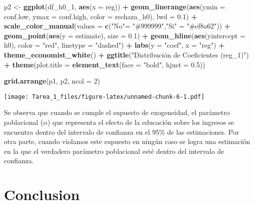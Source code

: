\documentclass[
]{article}
\newenvironment{Shaded}{\begin{snugshade}}{\end{snugshade}}
\newcommand{\AttributeTok}[1]{\textcolor[rgb]{0.13,0.29,0.53}{#1}}
\newcommand{\DecValTok}[1]{\textcolor[rgb]{0.00,0.00,0.81}{#1}}
\newcommand{\FloatTok}[1]{\textcolor[rgb]{0.00,0.00,0.81}{#1}}
\newcommand{\FunctionTok}[1]{\textcolor[rgb]{0.13,0.29,0.53}{\textbf{#1}}}
\newcommand{\NormalTok}[1]{#1}
\newcommand{\OtherTok}[1]{\textcolor[rgb]{0.56,0.35,0.01}{#1}}
\newcommand{\SpecialCharTok}[1]{\textcolor[rgb]{0.81,0.36,0.00}{\textbf{#1}}}
\newcommand{\StringTok}[1]{\textcolor[rgb]{0.31,0.60,0.02}{#1}}
\begin{document}
\begin{Shaded}
\begin{Highlighting}[]
\NormalTok{p2 }\OtherTok{\textless{}{-}} \FunctionTok{ggplot}\NormalTok{(df\_h0\_1, }\FunctionTok{aes}\NormalTok{(}\AttributeTok{x =}\NormalTok{ reg)) }\SpecialCharTok{+}
  \FunctionTok{geom\_linerange}\NormalTok{(}\FunctionTok{aes}\NormalTok{(}\AttributeTok{ymin =}\NormalTok{ conf.low, }\AttributeTok{ymax =}\NormalTok{ conf.high, }\AttributeTok{color =}\NormalTok{ rechaza\_h0), }\AttributeTok{lwd =} \FloatTok{0.1}\NormalTok{) }\SpecialCharTok{+} 
  \FunctionTok{scale\_color\_manual}\NormalTok{(}\AttributeTok{values =} \FunctionTok{c}\NormalTok{(}\StringTok{"No"}\OtherTok{=} \StringTok{"\#999999"}\NormalTok{,}\StringTok{"Si"} \OtherTok{=} \StringTok{"\#ef8a62"}\NormalTok{)) }\SpecialCharTok{+}
  \FunctionTok{geom\_point}\NormalTok{(}\FunctionTok{aes}\NormalTok{(}\AttributeTok{y =}\NormalTok{ estimate), }\AttributeTok{size =} \FloatTok{0.1}\NormalTok{) }\SpecialCharTok{+} 
  \FunctionTok{geom\_hline}\NormalTok{(}\FunctionTok{aes}\NormalTok{(}\AttributeTok{yintercept =}\NormalTok{ h0), }\AttributeTok{color =} \StringTok{"red"}\NormalTok{, }\AttributeTok{linetype =} \StringTok{"dashed"}\NormalTok{) }\SpecialCharTok{+}
  \FunctionTok{labs}\NormalTok{(}\AttributeTok{y =} \StringTok{"coef"}\NormalTok{, }\AttributeTok{x =} \StringTok{"reg"}\NormalTok{) }\SpecialCharTok{+}
  \FunctionTok{theme\_economist\_white}\NormalTok{() }\SpecialCharTok{+}
  \FunctionTok{ggtitle}\NormalTok{(}\StringTok{"Distribución de Coeficientes (reg\_1)"}\NormalTok{) }\SpecialCharTok{+}
  \FunctionTok{theme}\NormalTok{(}\AttributeTok{plot.title =} \FunctionTok{element\_text}\NormalTok{(}\AttributeTok{face =} \StringTok{"bold"}\NormalTok{, }\AttributeTok{hjust =} \FloatTok{0.5}\NormalTok{))}



\FunctionTok{grid.arrange}\NormalTok{(p1, p2, }\AttributeTok{ncol =} \DecValTok{2}\NormalTok{)}
\end{Highlighting}
\end{Shaded}

\texttt{[image: Tarea\_1\_files/figure-latex/unnamed-chunk-6-1.pdf]}

Se observa que cuando se cumple el supuesto de exogeneidad, el parámetro
poblacional (\(\alpha\)) que representa el efecto de la educación sobre
los ingresos se encuentra dentro del intervalo de confianza en el 95\%
de las estimaciones. Por otra parte, cuando violamos este supuesto en
ningún caso se logra una estimación en la que el verdadero parámetro
poblacional esté dentro del intervalo de confianza.

\section{Conclusion}\label{conclusion}
\end{document}
